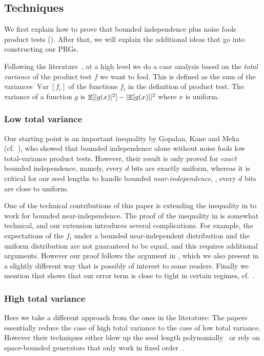 \documentclass{toc}
\DeclarePairedDelimiter{\abs}{\lvert}{\rvert}
\DeclareMathOperator*{\E}{\mathbb{E}}                 %
\DeclareMathOperator*{\Var}{Var}                 %
\begin{document}
\subsection{Techniques} \label{sec:techniques}

We first explain how to prove
that  %
bounded independence plus noise fools product
%
tests ().   %
After that, we will explain the additional ideas that go into
constructing our PRGs.

Following the literature~\cite{GopalanMRTV12,GopalanMRZ13,GopalanY14},
at a high level we do a case analysis based on the
\emph{total variance} %
%
of the product test $f$ we want to fool.
This is defined as the sum of the variances $\Var[f_i]$ of the functions $f_i$ in
the definition of product test.
The variance of a function $g$ is
$\E[\abs{g(x)}^2]- \abs{\E[g(x)]}^2$ where $x$ is uniform.
%
%

\subsubsection{Low total variance}    %
Our starting point is 
%
%
an important  %
inequality
%
by Gopalan, Kane and Meka~\cite{GopalanKM18} (cf.~\cite{GopalanMRTV12,GopalanY14}),
who showed that bounded independence alone without noise fools low
total-variance product tests.  %
However, their result %
%
%
is only proved for \emph{exact} bounded independence,
%
%
namely,
every $d$ bits are exactly uniform,
whereas it is critical for our seed lengths to handle
%
%
bounded \emph{near-independence},
%
%
%
\ie, every $d$ bits are close to uniform.  %
%

%
One of the technical contributions of %
this paper is extending the inequality in \cite{GopalanKM18} to work for
bounded near-independence.  The proof of the inequality in
\cite{GopalanKM18} is somewhat technical, and our extension introduces
several complications.  For example, the expectations of the $f_i$ under
a bounded near-independent distribution and the uniform distribution
are not guaranteed to be equal, and this requires additional arguments.
However our proof follows the argument in \cite{GopalanKM18}, which we
also present in a slightly different way that is possibly of interest to some
readers.
Finally we mention that  shows
that our error term is close to tight in certain regimes, cf.~.

\subsubsection{High total variance}  %
%
Here we take a different approach from the ones in the literature:
The papers~\cite{GavinskyLS12,GopalanKM18} essentially reduce the
case of high total variance to the case of low total variance.
However their techniques either blow up the seed length polynomially~\cite{GavinskyLS12}
%
or rely on space-bounded generators that only work in fixed
order~\cite{GopalanKM18}.
\end{document}
